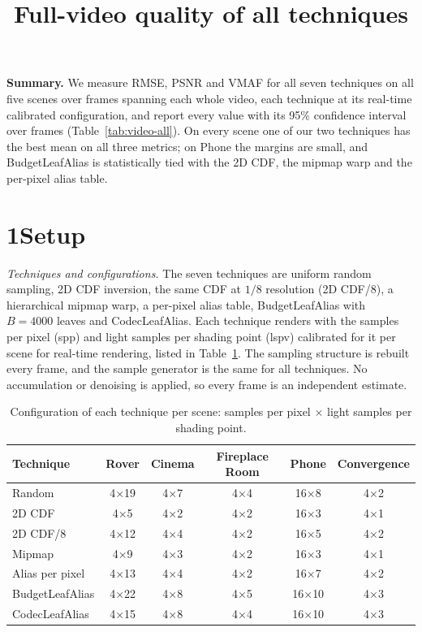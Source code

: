 \documentclass[10pt]{article}
\title{\vspace{-1.6em}Full-video quality of all techniques}
\author{}
\date{\vspace{-2.4em}}
\begin{document}
\maketitle
\vspace{-1.0em}

\textbf{Summary.} We measure RMSE, PSNR and VMAF for all seven techniques on all five scenes over frames spanning each whole video, each technique at its real-time calibrated configuration, and report every value with its 95\% confidence interval over frames (Table~\ref{tab:video-all}). On every scene one of our two techniques has the best mean on all three metrics; on Phone the margins are small, and BudgetLeafAlias is statistically tied with the 2D CDF, the mipmap warp and the per-pixel alias table.

\section*{1\quad Setup}

\emph{Techniques and configurations.} The seven techniques are uniform random sampling, 2D CDF inversion, the same CDF at $1/8$ resolution (2D CDF/8), a hierarchical mipmap warp, a per-pixel alias table, BudgetLeafAlias with $B=4000$ leaves and CodecLeafAlias. Each technique renders with the samples per pixel (spp) and light samples per shading point (lspv) calibrated for it per scene for real-time rendering, listed in Table~\ref{tab:configs}. The sampling structure is rebuilt every frame, and the sample generator is the same for all techniques. No accumulation or denoising is applied, so every frame is an independent estimate.

\begin{table}[h]
\centering\small
\caption{Configuration of each technique per scene: samples per pixel $\times$ light samples per shading point.}
\label{tab:configs}
\begin{tabular}{l c c c c c}
\toprule
Technique & Rover & Cinema & Fireplace Room & Phone & Convergence \\
\midrule
Random & 4$\times$19 & 4$\times$7 & 4$\times$4 & 16$\times$8 & 4$\times$2 \\
2D CDF & 4$\times$5 & 4$\times$2 & 4$\times$2 & 16$\times$3 & 4$\times$1 \\
2D CDF/8 & 4$\times$12 & 4$\times$4 & 4$\times$2 & 16$\times$5 & 4$\times$2 \\
Mipmap & 4$\times$9 & 4$\times$3 & 4$\times$2 & 16$\times$3 & 4$\times$1 \\
Alias per pixel & 4$\times$13 & 4$\times$4 & 4$\times$2 & 16$\times$7 & 4$\times$2 \\
BudgetLeafAlias & 4$\times$22 & 4$\times$8 & 4$\times$5 & 16$\times$10 & 4$\times$3 \\
CodecLeafAlias & 4$\times$15 & 4$\times$8 & 4$\times$4 & 16$\times$10 & 4$\times$3 \\
\bottomrule
\end{tabular}
\end{table}
\end{document}

